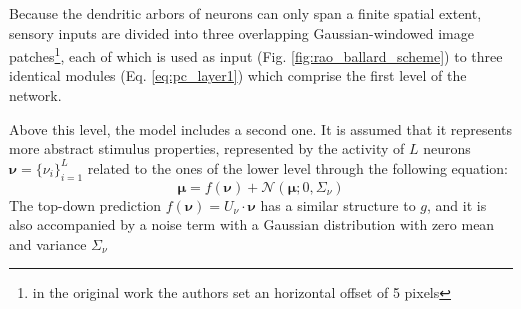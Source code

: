 \documentclass[10pt]{article}
\begin{document}
Because the dendritic arbors of neurons can only span a finite spatial extent, sensory inputs are divided into three overlapping Gaussian-windowed image patches\footnote{in the original work the authors set an horizontal offset of 5 pixels}, each of which is used as input (Fig. \ref{fig:rao_ballard_scheme}) to three identical modules (Eq. \ref{eq:pc_layer1}) which comprise the first level of the network.

Above this level, the model includes a second one. It is assumed that it represents more abstract stimulus properties, represented by the activity of $L$ neurons $\bm{\nu} = \lbrace{ \nu_i \rbrace}_{i=1}^{L}$ related to the ones of the lower level through the following equation:
\begin{equation}
    \bm{\mu} = f(\bm{\nu}) + \mathcal{N}(\bm{\mu}; 0, \Sigma_{\nu}) 
    \label{eq:pc_layer2}
\end{equation}
The top-down prediction $f(\bm{\nu}) = U_{\nu} \cdot \bm{\nu} $ has a similar structure to $g$, and it is also accompanied by a noise term with a Gaussian distribution with zero mean and variance $\Sigma_{\nu}$

\begin{comment}
\begin{figure}[!h]
    \centering
    \texttt{[image: rao\_ballard\_scheme.png]}
    \caption{Schematic illustration of the model as a Bayesian network. Each module of the first level can only generate a local portion of the input image. Specifically, each patch represents the receptive field of the corresponding level-1 module neurons. Conversely, since the second level generates all three sets of $\bm{\mu}$, the receptive field for these neurons becomes wider (the whole input size in this particular case). This phenomenon of receptive fields getting larger climbing up the hierarchy has also been observed in the occipitotemporal visual pathway \citep{Fellman1991}.}
    \label{fig:rao_ballard_scheme}
\end{figure}
\end{comment}
\end{document}
